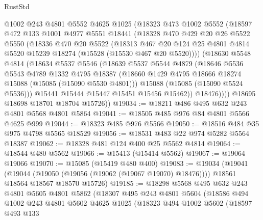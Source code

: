 \begin{lexlean}{RustStd}
\begin{coremodule}
        @1002
        @243
        @4801
        @5552
        @4625
        @1025
        (@18323
          @473
          @1002
          @5552
          (@18597
            @472
            @133
            @1001
            @4977
            @5551
            @18441
            (@18328
              @470
              @429
              @20
              @26
              @5522
              @5550
              (@18336
                @470
                @20
                @5522
                (@18313
                  @467
                  @20
                  @124
                  @25
                  @4801
                  @4814
                  @5520
                  @15239
                  @18274
                  (@15528 (@15530 @467 @20 @5520))))
              (@18630
                @5548
                @4814
                (@18634
                  @5537
                  @5546
                  (@18639
                    @5537
                    @5544
                    @4879
                    (@18646
                      @5536
                      @5543
                      @4789
                      @1332
                      @4795
                      @18387
                      (@18660 @1429 @4795 @18666 @18274 @15088 (@15085 (@15090 @5530 @4801)))
                      @15088
                      (@15085 (@15090 @5524 @5536)))
                    @15441
                    @15444
                    @15447
                    @15451
                    @15456
                    @15462))
                @18476))))
        @18695
        @18698
        @18701
        @18704
        @15726))
@19034 := @18211 @486 @495 @632 @243 @4801 @5568 @4801 @5864
@19041 := @18505 @485 @976 @84 @4801 @5566 @4625 @999
@19044 := @18323 @485 @976 @5566
@19050 := @18516 @484 @35 @975 @4798 @5565 @18529
@19056 := @18531 @483 @22 @974 @5282 @5564 @18387
@19062 := @18328 @481 @124 @400 @25 @5562 @4814
@19064 := @18544 @480 @5562
@19066 := @15413 (@15414 @5562)
@19067 := @19064 @19066
@19070 := @15085 (@15419 @480 @400)
@19083 := @19034
    (@19041
      (@19044 (@19050 (@19056 (@19062 (@19067 @19070) @18476))))
      @18561
      @18564
      @18567
      @18570
      @15726)
@19185 := @18298
    @5568
    @495
    @632
    @243
    @4801
    @5605
    @4801
    @5862
    (@18307
      @495
      @243
      @4801
      @5604
      (@18586
        @494
        @1002
        @243
        @4801
        @5602
        @4625
        @1025
        (@18323
          @494
          @1002
          @5602
          (@18597
            @493
            @133

\end{coremodule}
\end{lexlean}
